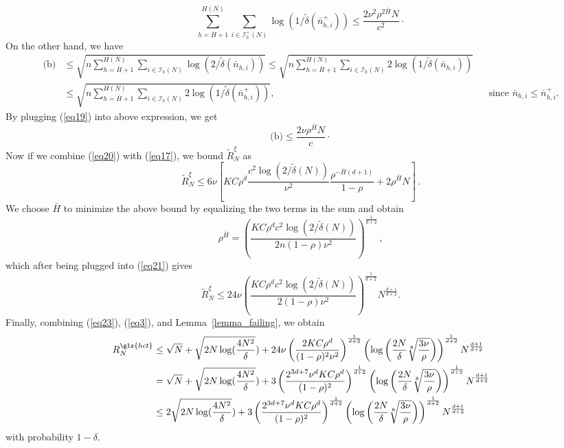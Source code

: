 \begin{equation} \label{eq19}
\sum_{h=\bar{H}+1}^{H(N)}\sum_{i\in\mathcal{I}_h^+(N)} \log(1/\tilde{\delta}(\bar{n}_{h,i}^+)) \leq \frac{2\nu^2\rho^{2\bar{H}}N}{c^2}\cdot
\end{equation}
On the other hand, we have
\begin{align*}
    \text{(b)} &\leq \sqrt{n\sum_{h=\bar{H}+1}^{H(N)}\sum_{i\in\mathcal{I}_h(N)} \log(2/\tilde{\delta}(\bar{n}_{h,i}))}
               \leq \sqrt{n\sum_{h=\bar{H}+1}^{H(N)}\sum_{i\in\mathcal{I}_h(N)} 2\log(1/\tilde{\delta}(\bar{n}_{h,i}))} \\
               &\leq \sqrt{n\sum_{h=\bar{H}+1}^{H(N)}\sum_{i\in\mathcal{I}_h(N)} 2\log(1/\tilde{\delta}(\bar{n}_{h,i}^+))}, && \text{since $\bar{n}_{h,i}\leq\bar{n}_{h,i}^+$.}
\end{align*}
By plugging (\ref{eq19}) into above expression, we get
\begin{equation} \label{eq20}
    \text{(b)} \leq \frac{2\nu\rho^{\bar{H}}N}{c}\cdot
\end{equation}
Now if we combine  (\ref{eq20}) with (\ref{eq17}), we  bound  $\tilde{R}_N^{\xi}$ as
\begin{equation} \label{eq21}
    \tilde{R}_N^{\xi} \leq 6\nu\left[KC\rho^d \frac{c^2\log(2/\tilde{\delta}(N))}{\nu^2} \frac{\rho^{-\bar{H}(d+1)}}{1-\rho} + 2\rho^{\bar{H}}N\right]\,.
\end{equation}
We  choose $\bar{H}$ to minimize the above bound by equalizing the two terms in the sum and  obtain
\begin{equation}
    \rho^{\bar{H}} = \left( \frac{KC\rho^dc^2\log(2/\tilde{\delta}(N))}{2n(1-\rho)\nu^2} \right)^{\frac{1}{d+2}}\,,
\end{equation}
which after being plugged into (\ref{eq21}) gives
\begin{equation} \label{eq23}
    \tilde{R}_N^{\xi} \leq 24\nu \left( \frac{KC\rho^dc^2\log(2/\tilde{\delta}(N))}{2(1-\rho)\nu^2} \right)^{\frac{1}{d+2}}N^{\frac{d+1}{d+2}}.
\end{equation}
Finally, combining (\ref{eq23}), (\ref{eq3}), and Lemma~\ref{lemma_failing}, we obtain
\begin{align*}
    R_N^{\gls{hct}} & \leq \sqrt{N} + \sqrt{2N\log(\frac{4N^2}{\delta}}) + 24\nu\left(\frac{2KC\rho^d}{(1-\rho)^2\nu^2}\right)^{\frac{1}{d+2}}\left(\log\left(\frac{2N}{\delta}\sqrt[8]{\frac{3\nu}{\rho}}\right)\right)^{\frac{1}{d+2}}N^{\frac{d+1}{d+2}} \\
                              & = \sqrt{N} + \sqrt{2N\log(\frac{4N^2}{\delta}}) + 3\left(\frac{2^{3d+7}\nu^d KC\rho^d}{(1-\rho)^{2}}\right)^{\frac{1}{d+2}}\left(\log\left(\frac{2N}{\delta}\sqrt[8]{\frac{3\nu}{\rho}}\right)\right)^{\frac{1}{d+2}}N^{\frac{d+1}{d+2}} \\
                              & \leq 2\sqrt{2N\log(\frac{4N^2}{\delta}}) + 3\left(\frac{2^{3d+7}\nu^d KC\rho^d}{(1-\rho)^{2}}\right)^{\frac{1}{d+2}}\left(\log\left(\frac{2N}{\delta}\sqrt[8]{\frac{3\nu}{\rho}}\right)\right)^{\frac{1}{d+2}}N^{\frac{d+1}{d+2}}
\end{align*}
with probability $1-\delta$.
